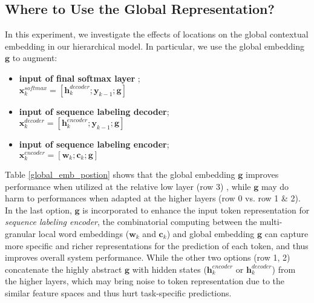 \documentclass[11pt,a4paper]{article}
\begin{document}
\subsection{Where to Use the Global Representation?} \label{section_global_position}
In this experiment, we investigate the effects of locations on the global contextual embedding in our hierarchical model. In particular, we use the global embedding $\mathbf{g}$ to augment:

\begin{itemize}
\item \textbf{input of final softmax layer }; \\ $\mathbf{x}_{k}^{softmax} = [\mathbf{h}_k^{decoder} ; \mathbf{y}_{k-1} ; \mathbf{g}]$
\item \textbf{input of sequence labeling decoder}; \\ 
$\mathbf{x}_{k}^{decoder} = [\mathbf{h}_k^{encoder} ; \mathbf{y}_{k-1}; \mathbf{g}]$
\item \textbf{input of sequence labeling encoder}; \\
$\mathbf{x}_{k}^{encoder} = [\mathbf{w}_k ; \mathbf{c}_k; \mathbf{g}]$
\end{itemize}

\begin{table}[t!]
\begin{center}
\end{center}
\caption{Comparison of CoNLL03 test $F_1$  when the global contextual embedding is used at different layers.}
\label{global_emb_postion}
\end{table}

Table \ref{global_emb_postion} shows that the global embedding $\mathbf{g}$ improves performance when utilized at the relative low layer (row 3) , while $\mathbf{g}$ may do harm to performances when adapted at the higher layers (row 0 vs. row 1 \& 2). In the last option, $\mathbf{g}$ is incorporated to enhance the input token representation for \emph{sequence labeling encoder}, the combinatorial computing between the multi-granular local word embeddings ($\mathbf{w}_k$ and $\mathbf{c}_k$) and global embedding $\mathbf{g}$ can capture more specific and richer representations for the prediction of each token, and thus improves overall system performance. While the other two options (row 1, 2) concatenate the highly abstract $\mathbf{g}$ with hidden states ($\mathbf{h}_k^{encoder}$ or $\mathbf{h}_k^{decoder}$) from the higher layers, which may bring noise to token representation due to the similar feature spaces and thus hurt task-specific predictions.
\end{document}
